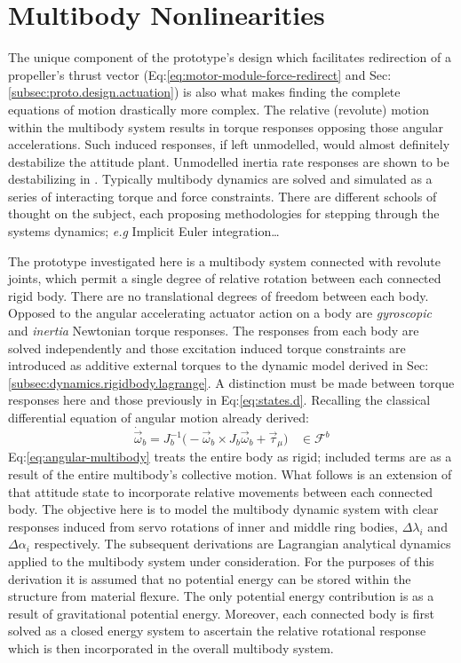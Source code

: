 \section{Multibody Nonlinearities}
\label{sec:dynamics.nonlinearities}
The unique component of the prototype's design which facilitates redirection of a propeller's thrust vector (Eq:\ref{eq:motor-module-force-redirect} and Sec:\ref{subsec:proto.design.actuation}) is also what makes finding the complete equations of motion drastically more complex. The relative (revolute) motion within the multibody system results in torque responses opposing those angular accelerations. Such induced responses, if left unmodelled, would almost definitely destabilize the attitude plant. Unmodelled inertia rate responses are shown to be destabilizing in \cite{inertiaspin}. Typically multibody dynamics are solved and simulated as a series of interacting torque and force constraints. There are different schools of thought on the subject, each proposing methodologies for stepping through the systems dynamics; \emph{e.g} Implicit Euler integration\cite{physicallybased,multibodydynamics}\ldots
\par
The prototype investigated here is a multibody system connected with revolute joints, which permit a single degree of relative rotation between each connected rigid body. There are no translational degrees of freedom between each body. Opposed to the angular accelerating actuator action on a body are \emph{gyroscopic} and \emph{inertia} Newtonian torque responses. The responses from each body are solved independently and those excitation induced torque constraints are introduced as additive external torques to the dynamic model derived in Sec:\ref{subsec:dynamics.rigidbody.lagrange}. A distinction must be made between torque responses here and those previously in Eq:\ref{eq:states.d}. Recalling the classical differential equation of angular motion already derived:
\begin{equation}\label{eq:angular-multibody}
\dot{\vec{\omega}}_b=J_b^{-1}\big(-\vec{\omega}_b\times J_b\vec{\omega}_b+\vec{\tau}_\mu\big)~~~~\in\mathcal{F}^b
\end{equation}
Eq:\ref{eq:angular-multibody} treats the entire body as rigid; included terms are as a result of the entire multibody's collective motion. What follows is an extension of that attitude state to incorporate relative movements between each connected body. The objective here is to model the multibody dynamic system with clear responses induced from servo rotations of inner and middle ring bodies, $\Delta\lambda_i$ and $\Delta\alpha_i$ respectively. The subsequent derivations are Lagrangian analytical dynamics applied to the multibody system under consideration. For the purposes of this derivation it is assumed that no potential energy can be stored within the structure from material flexure. The only potential energy contribution is as a result of gravitational potential energy. Moreover, each connected body is first solved as a closed energy system to ascertain the relative rotational response which is then incorporated in the overall multibody system.
